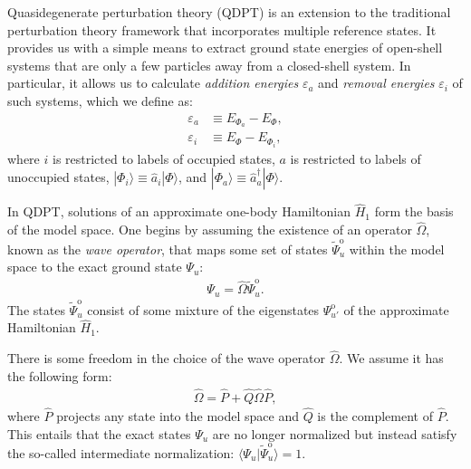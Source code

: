 \documentclass[aip, jcp, 12pt]{revtex4-1}
\begin{document}
Quasidegenerate perturbation theory (QDPT) is an extension to the traditional perturbation theory framework that incorporates multiple reference states.  It provides us with a simple means to extract ground state energies of open-shell systems that are only a few particles away from a closed-shell system.  In particular, it allows us to calculate \textit{addition energies} $\varepsilon_a$ and \textit{removal energies} $\varepsilon_i$ of such systems, which we define as:
\begin{align}
  \varepsilon_a &\equiv E_{\Phi_a} - E_{\Phi}, \\
  \varepsilon_i &\equiv E_{\Phi} - E_{\Phi_i},
\end{align}
where $i$ is restricted to labels of occupied states, $a$ is restricted to labels of unoccupied states, $|\Phi_i\rangle \equiv \hat{a}_i^{} |\Phi\rangle$, and $|\Phi_a\rangle \equiv \hat{a}_a^\dagger |\Phi\rangle$.

In QDPT, solutions of an approximate one-body Hamiltonian $\hat{H}_1$ form the basis of the model space.  One begins by assuming the existence of an operator $\hat{\Omega}$, known as the \textit{wave operator}, that maps some set of states $\tilde \Psi^{\mathrm{o}}_u$ within the model space to the exact ground state $\Psi_u$:
\begin{align} \label{eq:omega-condition1}
  \Psi_u = \hat \Omega \tilde \Psi^{\mathrm{o}}_u.
\end{align}
The states $\tilde \Psi^{\mathrm{o}}_u$ consist of some mixture of the eigenstates $\Psi^{\mathrm{o}}_{u'}$ of the approximate Hamiltonian $\hat{H}_1$.

There is some freedom in the choice of the wave operator $\hat \Omega$.  We assume it has the following form:
\begin{align} \label{eq:omega-condition2}
  \hat \Omega = \hat P + \hat Q \hat \Omega \hat P,
\end{align}
where $\hat P$ projects any state into the model space and $\hat Q$ is the complement of $\hat P$.  This entails that the exact states $\Psi_u$ are no longer normalized but instead satisfy the so-called intermediate normalization: $\langle \Psi_u | \tilde \Psi^{\mathrm{o}}_u \rangle = 1$.
\end{document}
